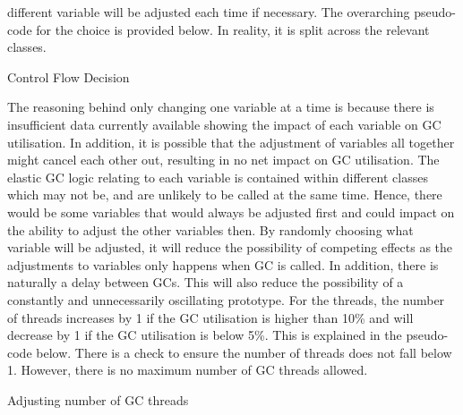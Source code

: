 different variable will be adjusted each time if necessary. The
overarching pseudo-code for the choice is provided below. In reality, it is split across the relevant classes.
\newline\newline
\begin{algorithm}[H]
\caption{Control Flow Decision}
\end{algorithm}
The reasoning behind only changing one variable at a time is because there is insufficient data currently available showing the impact of each variable on GC utilisation. In addition, it is possible that the adjustment of variables all together might cancel each other out, resulting in no net impact on GC utilisation. The elastic GC logic relating to each variable is contained within different classes which may not be, and are unlikely to be called at the same time. Hence, there
would be some variables that would always be adjusted first and could
impact on the ability to adjust the other variables then. By randomly
choosing what variable will be adjusted, it will reduce the possibility
of competing effects as the adjustments to variables only happens when
GC is called. In addition, there is naturally a delay between GCs. This will
also reduce the possibility of a constantly and unnecessarily
oscillating prototype. 
\newline\newline
For the threads, the number of threads increases by 1 if the GC utilisation is higher than 10\% and will
decrease by 1 if the GC utilisation is below 5\%. This is explained in
the pseudo-code below. There is a check to ensure the number of threads
does not fall below 1. However, there is no maximum number of GC threads
allowed.
\newline\newline
\begin{algorithm}[H]
\caption{Adjusting number of GC threads}
\end{algorithm}

